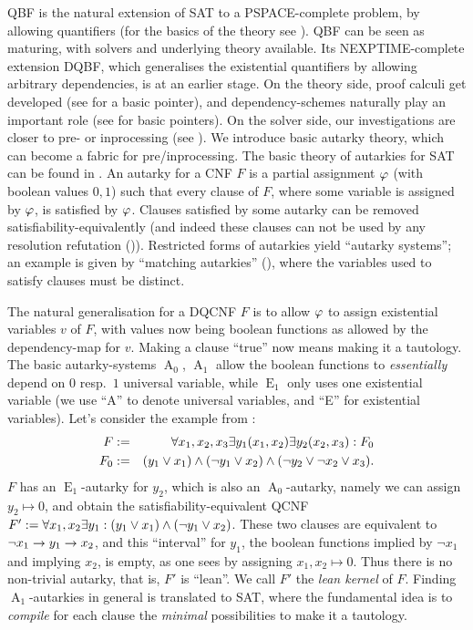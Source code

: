 \documentclass[conference]{IEEEtran}
\DeclareMathOperator{\Aaut}{A}
\DeclareMathOperator{\Eaut}{E}
\begin{document}
QBF is the natural extension of SAT to a PSPACE-complete problem, by allowing quantifiers (for the basics of the theory see \cite{KBB09HBSAT}).
QBF can be seen as maturing, with solvers and underlying theory available.
Its NEXPTIME-complete extension DQBF, which generalises the existential quantifiers by allowing arbitrary dependencies, is at an earlier stage.
On the theory side, proof calculi get developed (see \cite{BeyersdorffChewSchmidtSuda2016DQBF} for a basic pointer), and dependency-schemes naturally play an important role (see \cite{SlivovskySzeider2016Reordering,WimmerSchollWimmerBecker2016Dependencies} for basic pointers).
On the solver side, our investigations are closer to pre- or inprocessing (see \cite{WimmerSchollWimmerBecker2015Preprocessing}).
We introduce basic autarky theory, which can become a fabric for pre/inprocessing. The basic theory of autarkies for SAT can be found in \cite{Kullmann2007HandbuchMU}. An autarky for a CNF $F$ is a partial assignment $\varphi$ (with boolean values $0,1$) such that every clause of $F$, where some variable is assigned by $\varphi$, is satisfied by $\varphi$. Clauses satisfied by some autarky can be removed satisfiability-equivalently (and indeed these clauses can not be used by any resolution refutation (\cite{Ku00f})). Restricted forms of autarkies yield ``autarky systems''; an example is given by ``matching autarkies'' (\cite[Subsection 11.11.2]{Kullmann2007HandbuchMU}), where the variables used to satisfy clauses must be distinct.

The natural generalisation for a DQCNF $F$ is to allow $\varphi$ to assign existential variables $v$ of $F$, with values now being boolean functions as allowed by the dependency-map for $v$.
Making a clause ``true'' now means making it a tautology.
The basic autarky-systems $\Aaut_0$, $\Aaut_1$ allow the boolean functions to \emph{essentially} depend on $0$ resp.\ $1$ universal variable, while $\Eaut_1$ only uses one existential variable (we use ``A'' to denote universal variables, and ``E'' for existential variables).
Let's consider the example from \cite[after Definition 4]{BubeckHKB2006Dependencies}:
\begin{eqnarray*}
  F & := & \forall x_1,x_2,x_3 \exists y_1(x_1,x_2) \exists y_2(x_2,x_3) : F_0\\
  F_0 & := & (y_1 \vee x_1) \wedge (\neg y_1 \vee x_2) \wedge (\neg y_2 \vee \neg x_2 \vee x_3).
\end{eqnarray*}
$F$ has an $\Eaut_1$-autarky for $y_2$, which is also an $\Aaut_0$-autarky, namely we can assign $y_2 \mapsto 0$, and obtain the satisfiability-equivalent QCNF $F' := \forall x_1,x_2 \exists y_1 : (y_1 \vee x_1) \wedge (\neg y_1 \vee x_2)$.
These two clauses are equivalent to $\neg x_1 \rightarrow y_1 \rightarrow x_2$, and this ``interval'' for $y_1$, the boolean functions implied by $\neg x_1$ and implying $x_2$, is empty, as one sees by assigning $x_1, x_2 \mapsto 0$.
Thus there is no non-trivial autarky, that is, $F'$ is ``lean''.
We call $F'$ the \emph{lean kernel} of $F$.
Finding $\Aaut_1$-autarkies in general is translated to SAT, where the fundamental idea is to \emph{compile} for each clause the \emph{minimal} possibilities to make it a tautology.
\end{document}
